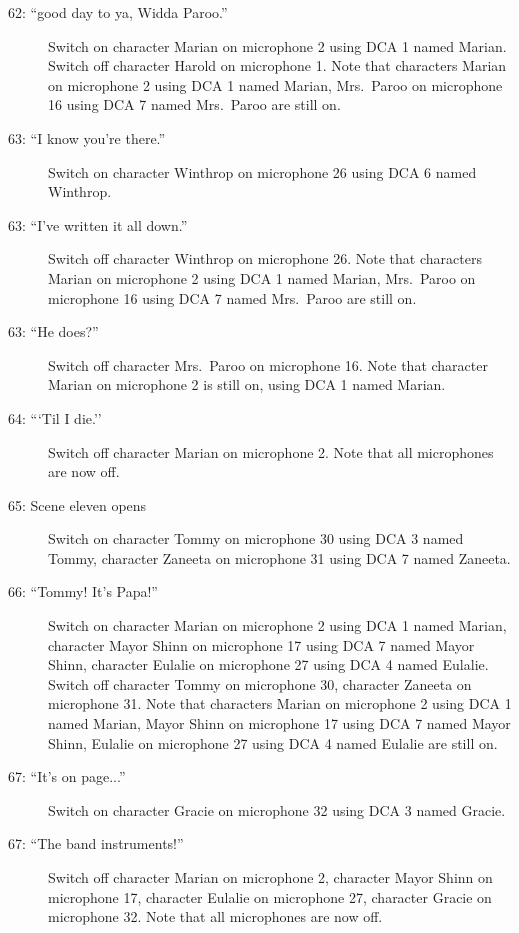 \begin{description}
\item[62: ``good day to ya, Widda Paroo.'']
Switch on character Marian on microphone 2 using DCA 1 named Marian. Switch off character Harold on microphone 1. Note that characters Marian on microphone 2 using DCA 1 named Marian, Mrs.~Paroo on microphone 16 using DCA 7 named Mrs.~Paroo are still on.  

\item[63: ``I know you're there.'']
Switch on character Winthrop on microphone 26 using DCA 6 named Winthrop. 

\item[63: ``I've written it all down.'']
Switch off character Winthrop on microphone 26. Note that characters Marian on microphone 2 using DCA 1 named Marian, Mrs.~Paroo on microphone 16 using DCA 7 named Mrs.~Paroo are still on.  

\item[63: ``He does?'']
Switch off character Mrs.~Paroo on microphone 16. Note that character Marian on microphone 2 is still on, using DCA 1 named Marian.

\item[64: ```Til I die.'']
Switch off character Marian on microphone 2. Note that all microphones are now off.

\item[65: Scene eleven opens]
Switch on character Tommy on microphone 30 using DCA 3 named Tommy, character Zaneeta on microphone 31 using DCA 7 named Zaneeta. 

\item[66: ``Tommy!  It's Papa!'']
Switch on character Marian on microphone 2 using DCA 1 named Marian, character Mayor Shinn on microphone 17 using DCA 7 named Mayor Shinn, character Eulalie on microphone 27 using DCA 4 named Eulalie. Switch off character Tommy on microphone 30, character Zaneeta on microphone 31. Note that characters Marian on microphone 2 using DCA 1 named Marian, Mayor Shinn on microphone 17 using DCA 7 named Mayor Shinn, Eulalie on microphone 27 using DCA 4 named Eulalie are still on.  

\item[67: ``It's on page...'']
Switch on character Gracie on microphone 32 using DCA 3 named Gracie. 

\item[67: ``The band instruments!'']
Switch off character Marian on microphone 2, character Mayor Shinn on microphone 17, character Eulalie on microphone 27, character Gracie on microphone 32. Note that all microphones are now off.


\end{description}
